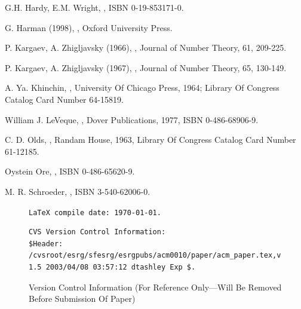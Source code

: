 \documentclass{esub2acm}
\begin{document}
\nocite{*}

\begin{thebibliography}{1}

G.H. Hardy, E.M. Wright,
, ISBN 0-19-853171-0.

G. Harman (1998), , Oxford University Press.

 P.  Kargaev, A. Zhigljavsky (1966),
,
Journal of Number Theory, 61,  209-225.

 P.  Kargaev, A. Zhigljavsky (1967),
,
Journal of Number Theory, 65,  130-149.

A. Ya. Khinchin,
, University Of
Chicago Press, 1964; Library Of Congress Catalog Card
Number 64-15819.

William J. LeVeque,
,
Dover Publications, 1977,
ISBN 0-486-68906-9.

C. D. Olds,
,
Randam House, 1963,
Library Of Congress Catalog Card Number 61-12185.

Oystein Ore,
,
ISBN 0-486-65620-9.

M. R. Schroeder,
,
ISBN 3-540-62006-0.

\end{thebibliography}

\clearpage

\begin{figure}
\caption{Version Control Information (For Reference Only---Will
Be Removed Before Submission Of Paper)}
\vspace{3.0mm}
\begin{tiny}
\texttt{\LaTeX{} compile date:  \today{}.}
\begin{verbatim}
CVS Version Control Information:
$Header: /cvsroot/esrg/sfesrg/esrgpubs/acm0010/paper/acm_paper.tex,v 1.5 2003/04/08 03:57:12 dtashley Exp $.
\end{verbatim}
\end{tiny}
\end{figure}
\end{document}
